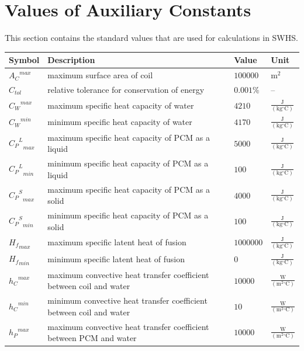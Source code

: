 \documentclass[12pt]{article}
\begin{document}
\section{Values of Auxiliary Constants}
\label{Sec:AuxConstants}
This section contains the standard values that are used for calculations in SWHS.
\begin{longtabu}{l X[l] l l}
\toprule
\textbf{Symbol} & \textbf{Description} & \textbf{Value} & \textbf{Unit}
\\
\midrule
\endhead
${{A_{C}}^{max}}$ & maximum surface area of coil & $100000$ & $\text{m}^{2}$
\\
${C_{tol}}$ & relative tolerance for conservation of energy & $0.001\%$ & --
\\
${{C_{W}}^{max}}$ & maximum specific heat capacity of water & $4210$ & $\frac{\text{J}}{(\text{kg}{}^{\circ}\text{C})}$
\\
${{C_{W}}^{min}}$ & minimum specific heat capacity of water & $4170$ & $\frac{\text{J}}{(\text{kg}{}^{\circ}\text{C})}$
\\
${{{C_{P}}^{L}}_{max}}$ & maximum specific heat capacity of PCM as a liquid & $5000$ & $\frac{\text{J}}{(\text{kg}{}^{\circ}\text{C})}$
\\
${{{C_{P}}^{L}}_{min}}$ & minimum specific heat capacity of PCM as a liquid & $100$ & $\frac{\text{J}}{(\text{kg}{}^{\circ}\text{C})}$
\\
${{{C_{P}}^{S}}_{max}}$ & maximum specific heat capacity of PCM as a solid & $4000$ & $\frac{\text{J}}{(\text{kg}{}^{\circ}\text{C})}$
\\
${{{C_{P}}^{S}}_{min}}$ & minimum specific heat capacity of PCM as a solid & $100$ & $\frac{\text{J}}{(\text{kg}{}^{\circ}\text{C})}$
\\
${{H_{f}}_{max}}$ & maximum specific latent heat of fusion & $1000000$ & $\frac{\text{J}}{(\text{kg}{}^{\circ}\text{C})}$
\\
${{H_{f}}_{min}}$ & minimum specific latent heat of fusion & $0$ & $\frac{\text{J}}{(\text{kg}{}^{\circ}\text{C})}$
\\
${{h_{C}}^{max}}$ & maximum convective heat transfer coefficient between coil and water & $10000$ & $\frac{\text{W}}{(\text{m}^{2}{}^{\circ}\text{C})}$
\\
${{h_{C}}^{min}}$ & minimum convective heat transfer coefficient between coil and water & $10$ & $\frac{\text{W}}{(\text{m}^{2}{}^{\circ}\text{C})}$
\\
${{h_{P}}^{max}}$ & maximum convective heat transfer coefficient between PCM and water & $10000$ & $\frac{\text{W}}{(\text{m}^{2}{}^{\circ}\text{C})}$

\end{longtabu}
\end{document}
